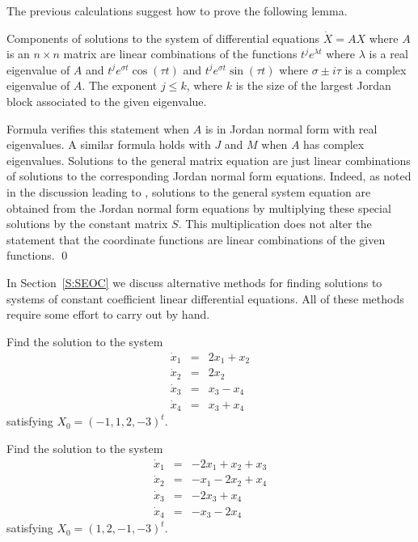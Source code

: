 The previous calculations suggest how to prove the following lemma.

\begin{lemma}  \label{R:pdeg}
Components of solutions to the system of differential equations $\dot{X}=AX$ 
where $A$ is an $n\times n$ matrix are linear combinations of the functions 
$t^je^{\lambda t}$ where $\lambda$ is a real eigenvalue of $A$ and 
$t^je^{\sigma t}\cos(\tau t)$ and $t^je^{\sigma t}\sin(\tau t)$ where
$\sigma\pm i\tau$ is a complex eigenvalue of $A$.   The exponent $j\leq k$, 
where $k$ is the size of the largest Jordan block associated to the given
eigenvalue. 
\end{lemma}

\proof  Formula  verifies this statement when $A$ is in Jordan 
normal form with real eigenvalues.  A similar formula holds with $J$ and $M$ 
when $A$ has complex eigenvalues.  Solutions to the general matrix equation 
are just linear combinations of solutions to the corresponding Jordan normal 
form equations.  Indeed, as noted in the discussion leading to , 
solutions to the general system equation are obtained from the Jordan normal 
form equations by multiplying these special solutions by the constant matrix
$S$.  This multiplication does not alter the statement that the coordinate
functions are linear combinations of the given functions.  \qed

In Section~\ref{S:SEOC} we discuss alternative methods for finding solutions 
to systems of constant coefficient linear differential equations.  All of
these methods require some effort to carry out by hand.


\EXER

\TEXER

\begin{exercise} \label{c11.1.1}
Find the solution to the system
\begin{eqnarray*}
\dot{x}_1 & = & 2x_1+x_2 \\
\dot{x}_2 & = & 2x_2 \\
\dot{x}_3 & = & x_3-x_4 \\
\dot{x}_4 & = & x_3+x_4
\end{eqnarray*}
satisfying $X_0=(-1,1,2,-3)^t$.
\end{exercise}

\begin{exercise} \label{c11.1.2}
Find the solution to the system
\begin{eqnarray*}
\dot{x}_1 & = & -2x_1+x_2+x_3 \\
\dot{x}_2 & = & -x_1-2x_2+x_4 \\
\dot{x}_3 & = & -2x_3+x_4 \\
\dot{x}_4 & = & -x_3-2x_4
\end{eqnarray*}
satisfying $X_0=(1,2,-1,-3)^t$.
\end{exercise}

